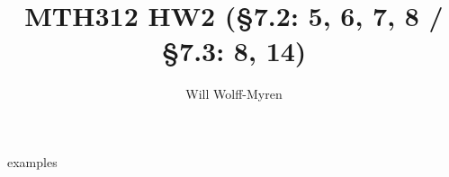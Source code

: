 \documentclass{article}
\title{MTH312 HW2 (\S7.2: 5, 6, 7, 8 /  \S7.3: 8, 14) }
\author{Will Wolff-Myren}
\begin{document}
    {examples} %
\end{document}
